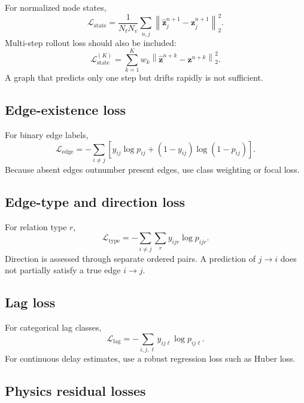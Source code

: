 \documentclass[11pt]{article}
\newcommand{\zvec}{\bm{z}}
\newcommand{\Lstate}{\mathcal{L}_{\mathrm{state}}}
\newcommand{\Ledge}{\mathcal{L}_{\mathrm{edge}}}
\newcommand{\Ltype}{\mathcal{L}_{\mathrm{type}}}
\newcommand{\Llag}{\mathcal{L}_{\mathrm{lag}}}
\begin{document}
For normalized node states,
\begin{equation}
\Lstate=\frac{1}{N_tN_v}\sum_{n,j}\left\|\widehat{\zvec}_j^{n+1}-\zvec_j^{n+1}\right\|_2^2.
\end{equation}
Multi-step rollout loss should also be included:
\begin{equation}
\Lstate^{(K)}=\sum_{k=1}^{K}w_k\left\|\widehat{\zvec}^{n+k}-\zvec^{n+k}\right\|_2^2.
\end{equation}
A graph that predicts only one step but drifts rapidly is not sufficient.

\subsection{Edge-existence loss}

For binary edge labels,
\begin{equation}
\Ledge=-\sum_{i\neq j}\left[y_{ij}\log p_{ij}+(1-y_{ij})\log(1-p_{ij})\right].
\end{equation}
Because absent edges outnumber present edges, use class weighting or focal loss.

\subsection{Edge-type and direction loss}

For relation type \(r\),
\begin{equation}
\Ltype=-\sum_{i\neq j}\sum_r y_{ijr}\log p_{ijr}.
\end{equation}
Direction is assessed through separate ordered pairs. A prediction of \(j\rightarrow i\) does not partially satisfy a true edge \(i\rightarrow j\).

\subsection{Lag loss}

For categorical lag classes,
\begin{equation}
\Llag=-\sum_{i,j,\ell}y_{ij\ell}\log p_{ij\ell}.
\end{equation}
For continuous delay estimates, use a robust regression loss such as Huber loss.

\subsection{Physics residual losses}
\end{document}
